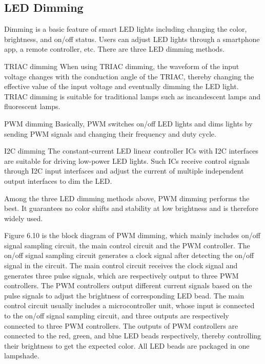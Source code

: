 \documentclass[a4paper,12pt]{book}
\begin{document}
\subsection{LED Dimming}
Dimming is a basic feature of smart LED lights including changing the color, brightness, and on/off status. Users can adjust LED lights through a smartphone app, a remote controller, etc. There are three LED dimming methods.

\begin{term}{TRIAC dimming}
    When using TRIAC dimming, the waveform of the input voltage changes with the conduction angle of the TRIAC, thereby changing the effective value of the input voltage and eventually dimming the LED light. TRIAC dimming is suitable for traditional lamps such as incandescent lamps and fluorescent lamps.
\end{term}

\begin{term}{PWM dimming}
    Basically, PWM switches on/off LED lights and dims lights by sending PWM signals and changing their frequency and duty cycle.
\end{term}

\begin{term}{I2C dimming}
    The constant-current LED linear controller ICs with I2C interfaces are suitable for driving low-power LED lights. Such ICs receive control signals through I2C input interfaces and adjust the current of multiple independent output interfaces to dim the LED.
\end{term}

Among the three LED dimming methods above, PWM dimming performs the best. It guarantees no color shifts and stability at low brightness and is therefore widely used.

Figure 6.10 is the block diagram of PWM dimming, which mainly includes on/off signal sampling circuit, the main control circuit and the PWM controller. The on/off signal sampling circuit generates a clock signal after detecting the on/off signal in the circuit. The main control circuit receives the clock signal and generates three pulse signals, which are respectively output to three PWM controllers. The PWM controllers output different current signals based on the pulse signals to adjust the brightness of corresponding LED bead. The main control circuit usually includes a microcontroller unit, whose input is connected to the on/off signal sampling circuit, and three outputs are respectively connected to three PWM controllers. The outputs of PWM controllers are connected to the red, green, and blue LED beads respectively, thereby controlling their brightness to get the expected color. All LED beads are packaged in one lampshade.
\end{document}

